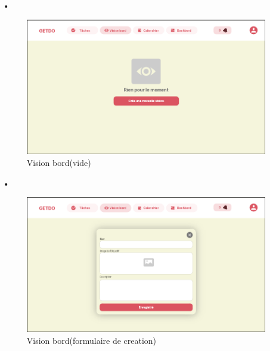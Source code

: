 \documentclass[a4paper,12pt]{report}
\begin{document}
\begin{itemize}
      \item[•]\begin{figure}[h!]
          \includegraphics[width=1\textwidth]{./images/getdo_screenshot/getdo_vision_empty.png}
          \caption{Vision bord(vide)}
          \label{fig:jira_project_task}
        \end{figure}
        
      \item[•]\begin{figure}[h!]
          \includegraphics[width=1\textwidth]{./images/getdo_screenshot/getdo_vision_form.png}
          \caption{Vision bord(formulaire de creation)}
          \label{fig:jira_project_task}
        \end{figure}
        

\end{itemize}
\end{document}
